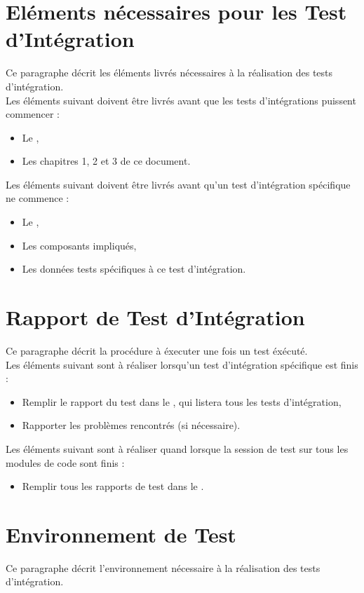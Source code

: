  
  
  \section{Eléments nécessaires pour les Test d'Intégration}
  	Ce paragraphe décrit les éléments livrés nécessaires à la réalisation des tests d'intégration. \\
  	
  	Les éléments suivant doivent être livrés avant que les tests d'intégrations puissent commencer :
  	\begin{itemize}
  		\item Le \PTU,
  		\item Les chapitres 1, 2 et 3 de ce document.
  	\end{itemize}
  	
  	Les éléments suivant doivent être livrés avant qu'un test d'intégration spécifique ne commence :
  	\begin{itemize}
  		\item Le \JTU,
  		\item Les composants impliqués,
  		\item Les données tests spécifiques à ce test d'intégration.
  	\end{itemize}
  
  \section{Rapport de Test d'Intégration}  
  	Ce paragraphe décrit la procédure à éxecuter une fois un test éxécuté.  \\
  	
  	Les éléments suivant sont à réaliser lorsqu'un test d'intégration spécifique est finis : 
  	\begin{itemize}
  		\item Remplir le rapport du test dans le \JTU, qui listera tous les tests d'intégration,
  		\item Rapporter les problèmes rencontrés (si nécessaire).
  	\end{itemize}
  	
  	Les éléments suivant sont à réaliser quand lorsque la session de test sur tous les modules de code sont finis : 
  	\begin{itemize}
  		\item Remplir tous les rapports de test dans le \JTU.
  	\end{itemize}
  
  \section{Environnement de Test}
	  Ce paragraphe décrit l'environnement nécessaire à la réalisation des tests d'intégration. \\
	  
